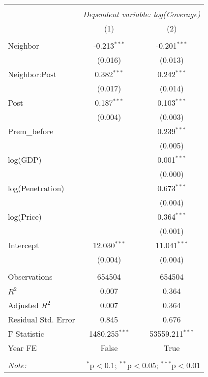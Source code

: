 
\begin{tabular}{@{\extracolsep{5pt}}lcc}
\\[-1.8ex]\hline
\hline \\[-1.8ex]
& \multicolumn{2}{c}{\textit{Dependent variable: log(Coverage)}} \
\cr \cline{2-3}
\\[-1.8ex] & (1) & (2) \\
\hline \\[-1.8ex]
 Neighbor & -0.213$^{***}$ & -0.201$^{***}$ \\
& (0.016) & (0.013) \\
 Neighbor:Post & 0.382$^{***}$ & 0.242$^{***}$ \\
& (0.017) & (0.014) \\
 Post & 0.187$^{***}$ & 0.103$^{***}$ \\
& (0.004) & (0.003) \\
 Prem\_before & & 0.239$^{***}$ \\
& & (0.005) \\
 log(GDP) & & 0.001$^{***}$ \\
& & (0.000) \\
 log(Penetration) & & 0.673$^{***}$ \\
& & (0.004) \\
 log(Price) & & 0.364$^{***}$ \\
& & (0.001) \\
Intercept & 12.030$^{***}$ & 11.041$^{***}$ \\
& (0.004) & (0.004) \\
\hline \\[-1.8ex]
 Observations & 654504 & 654504 \\
 $R^2$ & 0.007 & 0.364 \\
 Adjusted $R^2$ & 0.007 & 0.364 \\
 Residual Std. Error & 0.845  & 0.676  \\
 F Statistic & 1480.255$^{***}$  & 53559.211$^{***}$  \\
 Year FE & False & True\\
\hline
\hline \\[-1.8ex]
\textit{Note:} & \multicolumn{2}{r}{$^{*}$p$<$0.1; $^{**}$p$<$0.05; $^{***}$p$<$0.01} \\
\end{tabular}

